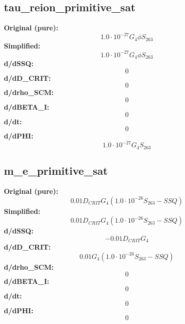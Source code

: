 \subsection{tau_reion_primitive_sat}
\textbf{Original (pure):}
\begin{equation}
1.0 \cdot 10^{-27} G_{4} \phi S_{26 3}
\end{equation}
\textbf{Simplified:}
\begin{equation}
1.0 \cdot 10^{-27} G_{4} \phi S_{26 3}
\end{equation}
\textbf{d/dSSQ:}
\begin{equation}
0
\end{equation}
\textbf{d/dD_CRIT:}
\begin{equation}
0
\end{equation}
\textbf{d/drho_SCM:}
\begin{equation}
0
\end{equation}
\textbf{d/dBETA_I:}
\begin{equation}
0
\end{equation}
\textbf{d/dt:}
\begin{equation}
0
\end{equation}
\textbf{d/dPHI:}
\begin{equation}
1.0 \cdot 10^{-27} G_{4} S_{26 3}
\end{equation}

\subsection{m_e_primitive_sat}
\textbf{Original (pure):}
\begin{equation}
0.01 D_{CRIT} G_{4} \left(1.0 \cdot 10^{-26} S_{26 3} - SSQ\right)
\end{equation}
\textbf{Simplified:}
\begin{equation}
0.01 D_{CRIT} G_{4} \left(1.0 \cdot 10^{-26} S_{26 3} - SSQ\right)
\end{equation}
\textbf{d/dSSQ:}
\begin{equation}
- 0.01 D_{CRIT} G_{4}
\end{equation}
\textbf{d/dD_CRIT:}
\begin{equation}
0.01 G_{4} \left(1.0 \cdot 10^{-26} S_{26 3} - SSQ\right)
\end{equation}
\textbf{d/drho_SCM:}
\begin{equation}
0
\end{equation}
\textbf{d/dBETA_I:}
\begin{equation}
0
\end{equation}
\textbf{d/dt:}
\begin{equation}
0
\end{equation}
\textbf{d/dPHI:}
\begin{equation}
0
\end{equation}

